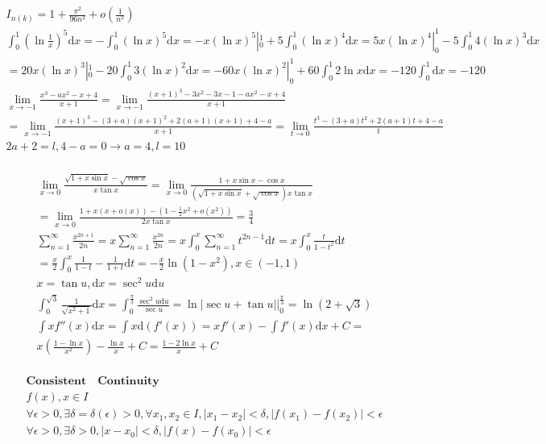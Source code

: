 \documentclass{article}
\begin{document}
\begin{align*}
    I_{n(k)} = 1 + \frac{\pi^{2}}{96n^2} + o(\frac{1}{n^2}) \\ 
    \int_{0}^{1}\left(\ln\frac{1}{x}\right)^5\mathrm{d}x= -\int_{0}^{1}(\ln x)^5\mathrm{d}x = -x(\ln x)^5|_{0}^{1} + 5 \int_{0}^{1} \left(\ln x\right)^4 \mathrm{d}x = 5x(\ln x)^4|_{0}^{1} - 5\int_{0}^{1} 4 (\ln x)^3\mathrm{d}x \\ 
    = 20x(\ln x)^3 |_{0}^{1} - 20\int_{0}^{1} 3(\ln x)^2\mathrm{d}x = -60x(\ln x)^2|_{0}^{1} + 60\int_{0}^{1} 2\ln x\mathrm{d}x = -120\int_{0}^{1} \mathrm{d}x = -120 \\ 
    \lim_{x \to -1} \frac{x^3-ax^2-x+4}{x+1} = \lim_{x \to -1} \frac{(x+1)^3-3x^2-3x-1-ax^2-x+4}{x+1} \\ 
    = \lim_{x \to -1} \frac{(x+1)^3-(3+a)(x+1)^2 +2(a+1)(x+1)+4-a}{x+1} = \lim_{t \to 0}\frac{t^3-(3+a)t^2+2(a+1)t+4-a}{t} \\
    2a+2=l,4-a=0 \rightarrow a=4,l=10 \\
\end{align*}
    

\begin{align*}
    \lim_{x \to 0}\frac{\sqrt{1+x\sin x}-\sqrt{\cos x}}{x\tan x} = \lim_{x \to 0} \frac{1+x\sin x-\cos x}{(\sqrt{1+x\sin x}+\sqrt{\cos x})x\tan x}  \\
    = \lim_{x \to 0} \frac{1+x(x+o(x))-\left(1-\frac{1}{2}x^2+o(x^2)\right)}{2x\tan x} = \frac{3}{4} \\
    \sum_{n=1}^{\infty} \frac{x^{2n+1}}{2n} = x\sum_{n=1}^{\infty} \frac{x^{2n}}{2n} = x\int_{0}^{x} \sum_{n=1}^{\infty}t^{2n-1}\mathrm{d}t = x\int_{0}^{x} \frac{t}{1-t^2}\mathrm{d}t \\
    =  \frac{x}{2} \int_{0}^{x} \frac{1}{1-t} - \frac{1}{1+t} \mathrm{d}t = -\frac{x}{2} \ln(1-x^2) ,x \in (-1,1) \\
    x = \tan u ,\mathrm{d}x = \sec^2 u\mathrm{d}u \\ 
    \int_{0}^{\sqrt{3}}\frac{1}{\sqrt{x^2+1}}\mathrm{d}x = \int_{0}^{\frac{\pi}{3}}\frac{\sec^2 u\mathrm{d}u}{\sec u} = \ln\left| \sec u + \tan u \right| |_{0}^{\frac{\pi}{3}} = \ln(2+\sqrt{3}) \\
    \int xf''(x)\mathrm{d}x = \int x\mathrm{d}(f'(x)) = xf'(x)-\int f'(x)\mathrm{d}x +C = \\
    x\left(\frac{1-\ln x}{x^2}\right)-\frac{\ln x}{x} + C = \frac{1-2\ln x}{x} + C\\
\end{align*}

\begin{align*}
    \bm{Consistent \quad Continuity} \\
    f(x) , x \in I \\
    \forall \epsilon > 0 ,\exists \delta  = \delta(\epsilon) > 0 , \forall x_{1},x_{2} \in I , |x_{1}-x_{2}| < \delta , |f(x_{1})-f(x_{2})| < \epsilon \\
    \forall \epsilon > 0 ,\exists \delta > 0 ,|x-x_{0}| < \delta ,|f(x)-f(x_{0})| < \epsilon\\ 
\end{align*}
\end{document}
